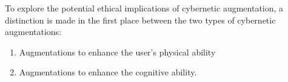 To explore the potential ethical implications of cybernetic augmentation, a distinction is made in the first place between the two types of cybernetic augmentations: 
\begin{enumerate}
	\item Augmentations to enhance the user's physical ability
	\item Augmentations to enhance the cognitive ability.
\end{enumerate}

